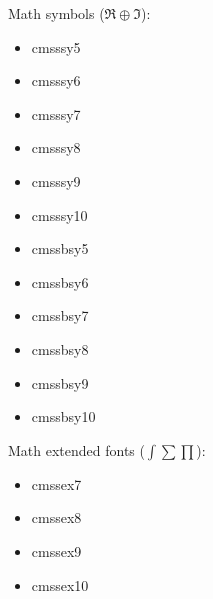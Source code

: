 \documentclass{amsart}
\begin{document}
\bigskip

Math symbols ($\Re\oplus \Im  $):

\nobreak

\noindent\parbox[t]{0.25\textwidth}{
\begin{itemize}
\item \textsf{cmsssy5}
\item \textsf{cmsssy6}
\item \textsf{cmsssy7}
\end{itemize}}\parbox[t]{0.25\textwidth}{\begin{itemize}
\item \textsf{cmsssy8}
\item \textsf{cmsssy9}
\item \textsf{cmsssy10}
\end{itemize}}\parbox[t]{0.25\textwidth}{\begin{itemize}
\item \textsf{cmssbsy5}
\item \textsf{cmssbsy6}
\item \textsf{cmssbsy7}
\end{itemize}}\parbox[t]{0.25\textwidth}{\begin{itemize}
\item \textsf{cmssbsy8}
\item \textsf{cmssbsy9}
\item \textsf{cmssbsy10}
\end{itemize}}

\bigskip


Math extended fonts ($\int \sum \prod$):

\nobreak

\noindent\parbox[t]{0.25\textwidth}{
\begin{itemize}
\item \textsf{cmssex7}
\end{itemize}}\parbox[t]{0.25\textwidth}{\begin{itemize}
\item \textsf{cmssex8}
\end{itemize}}\parbox[t]{0.25\textwidth}{\begin{itemize}
\item \textsf{cmssex9}
\end{itemize}}\parbox[t]{0.25\textwidth}{\begin{itemize}
\item \textsf{cmssex10}
\end{itemize}}

\bigskip
\end{document}
